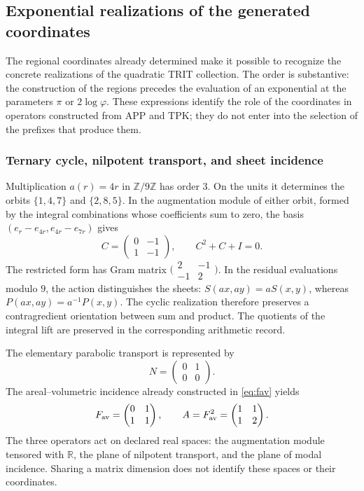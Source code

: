 \subsection{Exponential realizations of the generated coordinates}
\label{euler-trit-articulacion}

The regional coordinates already determined make it possible to recognize the
concrete realizations of the quadratic TRIT collection. The order is
substantive: the construction of the regions precedes the evaluation of an
exponential at the parameters \(\pi\) or \(2\log\varphi\). These expressions
identify the role of the coordinates in operators constructed from
APP and TPK; they do not enter into the selection of the prefixes that produce them.

\subsubsection{Ternary cycle, nilpotent transport, and sheet incidence}

Multiplication \(a(r)=4r\) in \(\mathbb Z/9\mathbb Z\) has order
\(3\). On the units it determines the orbits \(\{1,4,7\}\) and
\(\{2,8,5\}\). In the augmentation module of either orbit, formed by
the integral combinations whose coefficients sum to zero, the basis
\((e_r-e_{4r},e_{4r}-e_{7r})\) gives
\[
 C=\begin{pmatrix}0&-1\\1&-1\end{pmatrix},
 \qquad C^2+C+I=0.
\]
The restricted form has Gram matrix
\(\bigl(\begin{smallmatrix}2&-1\\-1&2\end{smallmatrix}\bigr)\).
In the residual evaluations modulo \(9\), the action distinguishes the sheets:
\(S(ax,ay)=aS(x,y)\), whereas \(P(ax,ay)=a^{-1}P(x,y)\).
The cyclic realization therefore preserves a contragredient orientation
between sum and product. The quotients of the integral lift are preserved
in the corresponding arithmetic record.

The elementary parabolic transport is represented by
\[
 N=\begin{pmatrix}0&1\\0&0\end{pmatrix}.
\]
The areal--volumetric incidence already constructed in \eqref{eq:fav} yields
\[
 F_{\rm av}=\begin{pmatrix}0&1\\1&1\end{pmatrix},
 \qquad A=F_{\rm av}^2=\begin{pmatrix}1&1\\1&2\end{pmatrix}.
\]
The three operators act on declared real spaces: the augmentation module
tensored with \(\mathbb R\), the plane of nilpotent transport, and
the plane of modal incidence. Sharing a matrix dimension does not identify
these spaces or their coordinates.

